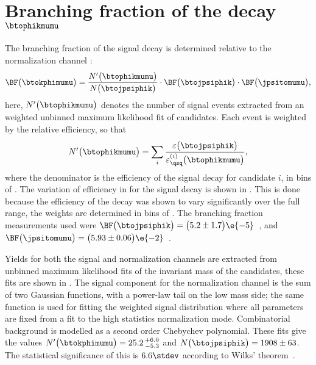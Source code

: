 \section[Branching fraction of the decay \btophikmumu]
{Branching fraction of the decay $\boldsymbol{\btophikmumu}$}

The branching fraction of the signal decay \btophikmumu is determined relative to the normalization
channel \btojpsiphik:
\begin{equation}
  \BF\big(\btokphimumu\big)=
  \frac{ N^\prime\big(\btophikmumu\big) }{ N\big(\btojpsiphik\big) }
  \cdot\BF\big(\btojpsiphik\big)
  \cdot\BF\big(\jpsitomumu\big),
\end{equation}
here, $N^\prime\big(\btophikmumu\big)$ denotes the number of signal events extracted from an
weighted unbinned maximum likelihood fit of \btophikmumu candidates.
Each event is weighted by the relative efficiency, so that
\begin{equation}
  N^\prime\big(\btophikmumu\big)
  =
  \sum_i\frac{\varepsilon\big(\btojpsiphik\big)}{\varepsilon_{\qsq}^{(i)}\big(\btophikmumu\big)},
\end{equation}
where the denominator is the efficiency of the signal decay for candidate $i$, in bins of \qsq.
The variation of efficiency in \qsq for the signal decay is shown in
.
This is done because the efficiency of the decay \btophikmumu was shown to vary significantly over
the full \qsq range, the weights are determined in bins of \qsq.
The branching fraction measurements used were
$\BF\big(\btojpsiphik\big)=\big(5.2\pm1.7\big)\e{-5}$~\cite{PDG2012},
and $\BF\big(\jpsitomumu\big)=\big(5.93\pm0.06\big)\e{-2}$~\cite{PDG2012}.

Yields for both the signal and normalization channels are extracted from unbinned maximum
likelihood fits of the invariant mass of the \Bp candidates, these fits are shown in
.
The signal component for the normalization channel is the sum of two Gaussian functions, with a
power-law tail on the low mass side; the same function is used for fitting the weighted signal
distribution where all parameters are fixed from a fit to the high statistics normalization mode.
Combinatorial background is modelled as a second order Chebychev polynomial.
These fits give the values
$N^\prime\big(\btokphimumu\big)=25.2\,^{+6.0}_{-5.3}$ and
$N\big(\btojpsiphik\big)=1908\pm63$.
The statistical significance of this is $6.6\stdev$ according to Wilks' theorem~\cite{wilks1938}.

